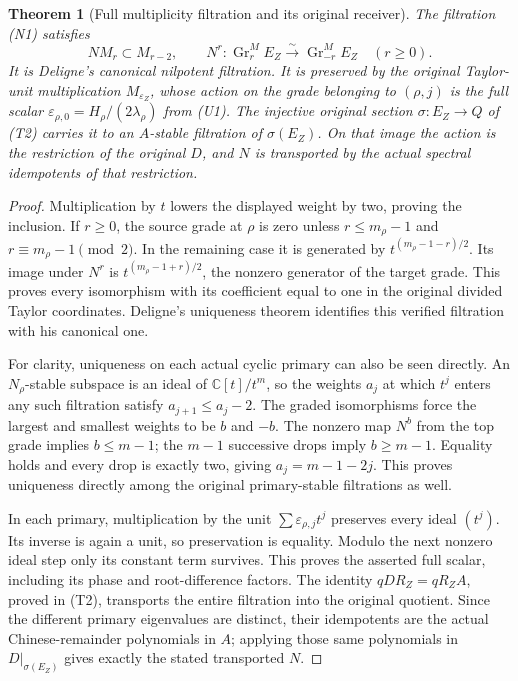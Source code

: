 \documentclass[11pt]{article}
\newtheorem{theorem}{Theorem}[section]
\newcommand{\C}{\mathbb C}\newcommand{\R}{\mathbb R}
\begin{document}
\begin{theorem}[Full multiplicity filtration and its original receiver]
The filtration (N1) satisfies
\[
 NM_r\subset M_{r-2},\qquad
 N^r:\operatorname{Gr}_r^M E_Z\xrightarrow{\sim}
             \operatorname{Gr}_{-r}^M E_Z\quad(r\geq0).
 \tag{N2}
\]
It is Deligne's canonical nilpotent filtration. It is preserved by the
original Taylor-unit multiplication $M_{\varepsilon_Z}$, whose action on
the grade belonging to $(\rho,j)$ is the full scalar
$\varepsilon_{\rho,0}=H_\rho/(2\lambda_\rho)$ from (U1).
The injective original section $\sigma:E_Z\to Q$ of (T2) carries it to
an $A$-stable filtration of $\sigma(E_Z)$. On that image the action is
the restriction of the original $D$, and $N$ is transported by the
actual spectral idempotents of that restriction.
\end{theorem}
\begin{proof}
Multiplication by $t$ lowers the displayed weight by two, proving the
inclusion. If $r\geq0$, the source grade at $\rho$ is zero unless
$r\leq m_\rho-1$ and $r\equiv m_\rho-1\pmod2$. In the remaining
case it is generated by $t^{(m_\rho-1-r)/2}$. Its image under $N^r$
is $t^{(m_\rho-1+r)/2}$, the nonzero generator of the target grade.
This proves every isomorphism with its coefficient equal to one in
the original divided Taylor coordinates. Deligne's uniqueness theorem
identifies this verified filtration with his canonical one.

For clarity, uniqueness on each actual cyclic primary can also be seen
directly. An $N_\rho$-stable subspace is an ideal of $\C[t]/t^m$,
so the weights $a_j$ at which $t^j$ enters any such filtration satisfy
$a_{j+1}\leq a_j-2$. The graded isomorphisms force the largest and
smallest weights to be $b$ and $-b$. The nonzero map $N^b$ from the
top grade implies $b\leq m-1$; the $m-1$ successive drops imply
$b\geq m-1$. Equality holds and every drop is exactly two, giving
$a_j=m-1-2j$. This proves uniqueness directly among the original
primary-stable filtrations as well.

In each primary, multiplication by the unit
$\sum\varepsilon_{\rho,j}t^j$ preserves every ideal $(t^j)$.
Its inverse is again a unit, so preservation is equality. Modulo the
next nonzero ideal step only its constant term survives. This proves
the asserted full scalar, including its phase and root-difference
factors. The identity $qDR_Z=qR_ZA$, proved in (T2), transports the
entire filtration into the original quotient. Since the different
primary eigenvalues are distinct, their idempotents are the actual
Chinese-remainder polynomials in $A$; applying those same polynomials
in $D|_{\sigma(E_Z)}$ gives exactly the stated transported $N$.
\end{proof}
\end{document}

